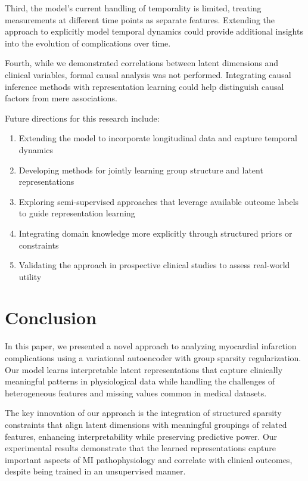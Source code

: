 \documentclass[oupdraft]{bio}
\begin{document}
Third, the model's current handling of temporality is limited, treating measurements at different time points as separate features. Extending the approach to explicitly model temporal dynamics could provide additional insights into the evolution of complications over time.

Fourth, while we demonstrated correlations between latent dimensions and clinical variables, formal causal analysis was not performed. Integrating causal inference methods with representation learning could help distinguish causal factors from mere associations.

Future directions for this research include:
\begin{enumerate}
    \item Extending the model to incorporate longitudinal data and capture temporal dynamics
    \item Developing methods for jointly learning group structure and latent representations
    \item Exploring semi-supervised approaches that leverage available outcome labels to guide representation learning
    \item Integrating domain knowledge more explicitly through structured priors or constraints
    \item Validating the approach in prospective clinical studies to assess real-world utility
\end{enumerate}



\section{Conclusion}
\label{sec7}

In this paper, we presented a novel approach to analyzing myocardial infarction complications using a variational autoencoder with group sparsity regularization. Our model learns interpretable latent representations that capture clinically meaningful patterns in physiological data while handling the challenges of heterogeneous features and missing values common in medical datasets.

The key innovation of our approach is the integration of structured sparsity constraints that align latent dimensions with meaningful groupings of related features, enhancing interpretability while preserving predictive power. Our experimental results demonstrate that the learned representations capture important aspects of MI pathophysiology and correlate with clinical outcomes, despite being trained in an unsupervised manner.
\end{document}
